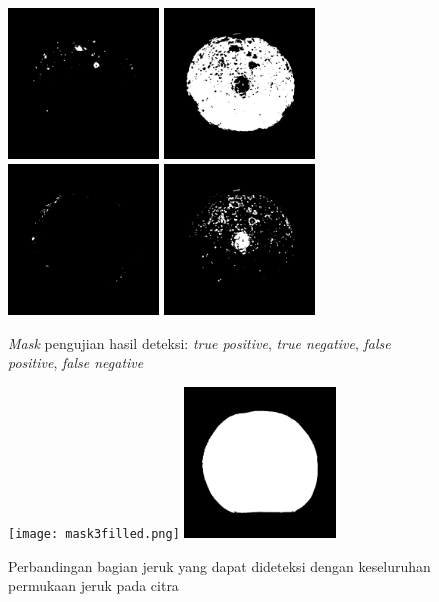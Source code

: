 \documentclass[laporan.tex]{subfiles}
\begin{document}
\begin{figure}[h!]
\centering
\includegraphics[width=4cm]{tp3.png} \qquad
\includegraphics[width=4cm]{tn3.png} \vskip 0.5cm
\includegraphics[width=4cm]{fp3.png} \qquad
\includegraphics[width=4cm]{fn3.png}
\caption{\emph{Mask} pengujian hasil deteksi: \emph{true positive}, \emph{true negative}, \emph{false positive}, \emph{false negative}}
\end{figure}

\begin{figure}[h!]
\centering
\texttt{[image: mask3filled.png]} \qquad
\includegraphics[width=4cm]{detected3.png}
\caption{Perbandingan bagian jeruk yang dapat dideteksi dengan keseluruhan permukaan jeruk pada citra}
\end{figure}
\end{document}
